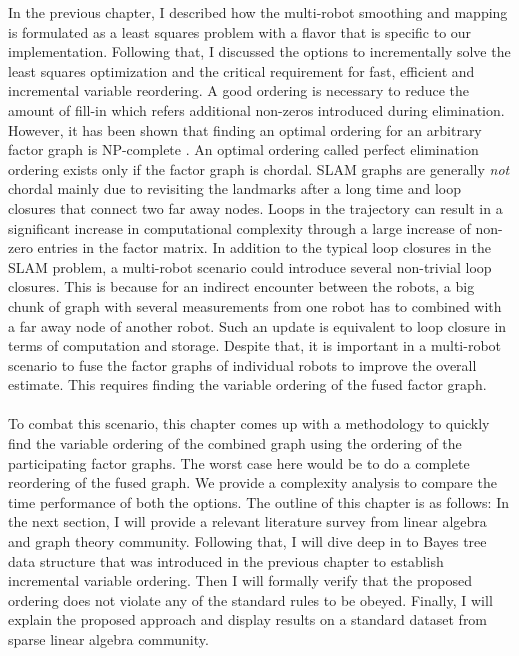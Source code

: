 In the previous chapter, I described how the multi-robot smoothing and mapping is formulated as a least squares problem with a flavor that is specific to our implementation. Following that, I discussed the options to incrementally solve the least squares optimization and the critical requirement for fast, efficient and incremental variable reordering. A good ordering is necessary to reduce the amount of fill-in which refers additional non-zeros introduced during elimination. However, it has been shown that finding an optimal ordering for an arbitrary factor graph is NP-complete \cite{orderingnphard}. An optimal ordering called perfect elimination ordering \cite{chordaloptimalordering} exists only if the factor graph is chordal. SLAM graphs are generally \textit{not} chordal mainly due to revisiting the landmarks after a long time and loop closures that connect two far away nodes. Loops in the trajectory can result in a significant increase in computational complexity through a large increase of non-zero entries in the factor matrix. In addition to the typical loop closures in the SLAM problem, a multi-robot scenario could introduce several non-trivial loop closures. This is because for an indirect encounter between the robots, a big chunk of graph with several measurements from one robot has to combined with a far away node of another robot. Such an update is equivalent to loop closure in terms of computation and storage. Despite that, it is important in a multi-robot scenario to fuse the factor graphs of individual robots to improve the overall estimate. This requires finding the variable ordering of the fused factor graph.
\paragraph{}
To combat this scenario, this chapter comes up with a methodology to quickly find the variable ordering of the combined graph using the ordering of the participating factor graphs. The worst case here would be to do a complete reordering of the fused graph. We provide a complexity analysis to compare the time performance of both the options. The outline of this chapter is as follows: In the next section, I will provide a relevant literature survey from linear algebra and graph theory community. Following that, I will dive deep in to Bayes tree data structure that was introduced in the previous chapter to establish incremental variable ordering. Then I will formally verify that the proposed ordering does not violate any of the standard rules to be obeyed. Finally, I will explain the proposed approach and display results on a standard dataset from sparse linear algebra community.

